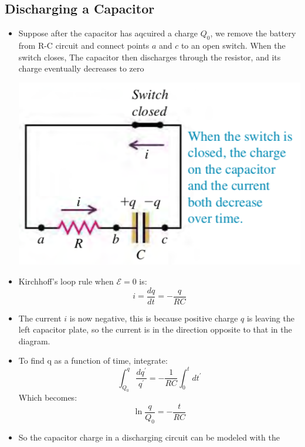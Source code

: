 \documentclass[11pt, a4paper]{article}
\begin{document}
\subsection{Discharging a Capacitor}
\begin{itemize}
    \item Suppose after the capacitor has aqcuired a charge $Q_0$, we remove the battery
        from R-C circuit and connect points $a$ and $c$ to an open switch. When the
        switch closes, The capacitor then discharges through the resistor, and its charge
        eventually decreases to zero

        \centerline{\includegraphics[scale=0.65]{images/discharging_circuit.png}}
    \item Kirchhoff’s loop rule when $\mathcal{E} = 0$ is:
        \begin{equation}
            i = \frac{dq}{dt} = - \frac{q}{RC}
        \end{equation}
    \item The current $i$ is now negative, this is because positive charge $q$ is leaving
        the left capacitor plate, so the current is in the direction opposite to that in
        the diagram.
    \item To find q as a function of time, integrate:
        \begin{equation}
            \int_{Q_0}^{q} \frac{dq^{\prime}}{q^{\prime}} =
            - \frac{1}{RC} \int_{0}^{t} dt^{\prime}
        \end{equation}
        Which becomes:
        \begin{equation}
            \ln \frac{q}{Q_0} = - \frac{t}{RC}
        \end{equation}
    \item So the capacitor charge in a discharging circuit can be modeled with the

\end{itemize}
\end{document}
